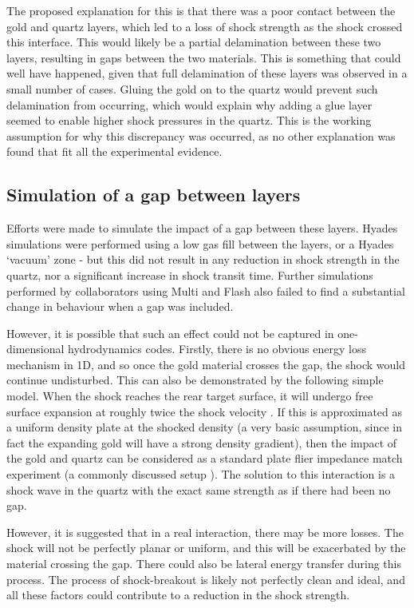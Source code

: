 The proposed explanation for this is that there was a poor contact between the gold and quartz layers, which led to a loss of shock strength as the shock crossed this interface. This would likely be a partial delamination between these two layers, resulting in gaps between the two materials. This is something that could well have happened, given that full delamination of these layers was observed in a small number of cases. Gluing the gold on to the quartz would prevent such delamination from occurring, which would explain why adding a glue layer seemed to enable higher shock pressures in the quartz. This is the working assumption for why this discrepancy was occurred, as no other explanation was found that fit all the experimental evidence.


\subsection{Simulation of a gap between layers}

Efforts were made to simulate the impact of a gap between these layers. Hyades simulations were performed using a low gas fill between the layers, or a Hyades `vacuum' zone - but this did not result in any reduction in shock strength in the quartz, nor a significant increase in shock transit time. Further simulations performed by collaborators using Multi and Flash also failed to find a substantial change in behaviour when a gap was included.

However, it is possible that such an effect could not be captured in one-dimensional hydrodynamics codes. Firstly, there is no obvious energy loss mechanism in 1D, and so once the gold material crosses the gap, the shock would continue undisturbed. This can also be demonstrated by the following simple model. When the shock reaches the rear target surface, it will undergo free surface expansion at roughly twice the shock velocity \cite{Forbes2012}. If this is approximated as a uniform density plate at the shocked density (a very basic assumption, since in fact the expanding gold will have a strong density gradient), then the impact of the gold and quartz can be considered as a standard plate flier impedance match experiment (a commonly discussed setup \cite{Forbes2012}). The solution to this interaction is a shock wave in the quartz with the exact same strength as if there had been no gap.

However, it is suggested that in a real interaction, there may be more losses. The shock will not be perfectly planar or uniform, and this will be exacerbated by the material crossing the gap. There could also be lateral energy transfer during this process. The process of shock-breakout is likely not perfectly clean and ideal, and all these factors could contribute to a reduction in the shock strength.

